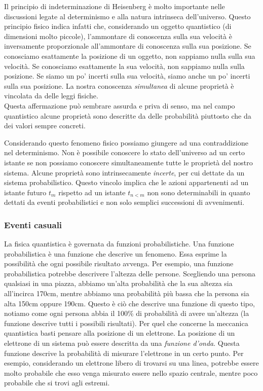 \documentclass[a4paper, 12pt]{article}
\begin{document}
Il principio di indeterminazione di Heisenberg è molto importante nelle discussioni
legate al determinismo e alla natura intrinseca dell'universo.
Questo principio fisico indica infatti che, considerando un oggetto quantistico (di dimensioni molto piccole),
l'ammontare di conoscenza sulla sua velocità è inversamente proporzionale all'ammontare
di conoscenza sulla sua posizione.
Se conosciamo esattamente la posizione di un oggetto, non sappiamo nulla sulla sua velocità.
Se conosciamo esattamente la sua velocità, non sappiamo nulla sulla posizione. Se siamo un po'
incerti sulla sua velocità, siamo anche un po' incerti sulla sua posizione.
La nostra conoscenza \textit{simultanea} di alcune proprietà è vincolata da delle leggi fisiche. \\
Questa affermazione può sembrare assurda e priva di senso, ma nel campo quantistico
alcune proprietà sono descritte da delle probabilità piuttosto che da dei valori sempre concreti.

Considerando questo fenomeno fisico possiamo giungere ad una contraddizione nel determinismo.
Non è possibile conoscere lo stato dell'universo ad un certo istante se non possiamo
conoscere simultaneamente tutte le proprietà del nostro sistema.
Alcune proprietà sono intrinsecamente \textit{incerte}, per cui
dettate da un sistema probabilistico. Questo vincolo implica che
le azioni appartenenti ad un istante futuro \(t_m\) rispetto ad un istante
\(t_{n < m}\) non sono determinabili in quanto dettati da eventi probabilistici
e non solo semplici successioni di avvenimenti.

\subsubsection{Eventi casuali}

La fisica quantistica è governata da funzioni probabilistiche.
Una funzione probabilistica è una funzione che descrive un fenomeno. Essa
esprime la possibilità che ogni possibile risultato avvenga. Per esempio,
una funzione probabilistica potrebbe descrivere l'altezza delle persone.
Scegliendo una persona qualsiasi in una piazza, abbiamo un'alta probabilità che la sua altezza
sia all'incirca 170cm, mentre abbiamo una probabilità più bassa che la persona sia alta 150cm oppure 190cm.
Questo è ciò che descrive una funzione di questo tipo, notiamo come ogni persona abbia il 100\% di probabilità
di avere un'altezza (la funzione descrive tutti i possibili risultati).
Per quel che concerne la meccanica quantistica basti pensare alla posizione di un elettrone. La posizione di un elettrone
di un sistema può essere descritta da una \textit{funzione d'onda}. Questa funzione descrive
la probabilità di misurare l'elettrone in un certo punto. Per esempio, considerando un elettrone libero
di trovarsi su una linea, potrebbe essere molto probabile che esso venga misurato essere nello spazio centrale, mentre
poco probabile che si trovi agli estremi.
\end{document}

